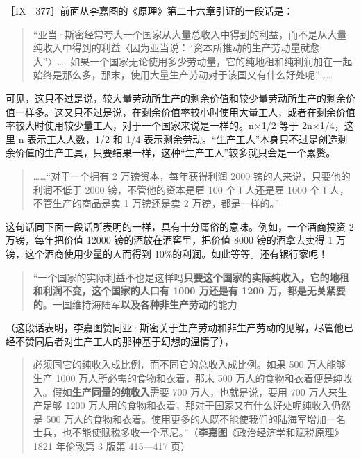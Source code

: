 
［IX—377］前面从李嘉图的《原理》第二十六章引证的一段话是：

\begin{quote}“亚当·斯密经常夸大一个国家从大量总收入中得到的利益，而不是从大量纯收入中得到的利益〈因为亚当说：“资本所推动的生产劳动量就愈大”〉……如果一个国家无论使用多少劳动量，它的纯地租和纯利润加在一起始终是那么多，那末，使用大量生产劳动对于该国又有什么好处呢”……\end{quote}

\fontbox{~\{}可见，这只不过是说，较大量劳动所生产的剩余价值和较少量劳动所生产的剩余价值一样多。这又只不过是说，在剩余价值率较小时使用大量工人，或者在剩余价值率较大时使用较少量工人，对于一个国家来说是一样的。n×1/2 等于 2n×1/4，这里 n 表示工人人数，1/2 和 1/4 表示剩余劳动。“生产工人”本身只不过是创造剩余价值的生产工具，只要结果一样，这种“生产工人”较多就只会是一个累赘。\fontbox{\}~}

\begin{quote}……“对于一个拥有 2 万镑资本，每年获得利润 2000 镑的人来说，只要他的利润不低于 2000 镑，不管他的资本是雇 100 个工人还是雇 1000 个工人，不管生产的商品是卖 1 万镑还是卖 2 万镑，都是一样的。”\end{quote}

\fontbox{~\{}这句话同下面一段话所表明的一样，具有十分庸俗的意味。例如，一个酒商投资 2 万镑，每年把价值 12000 镑的酒放在酒窖里，把价值 8000 镑的酒拿去卖得 1 万镑，这个酒商使用少量的人而得到 10\%的利润。如此等等。还有银行家呢！\fontbox{\}~}

\begin{quote}“一个国家的实际利益不也是这样吗\textbf{只要这个国家的实际纯收入，它的地租和利润不变，这个国家的人口有 1000 万还是有 1200 万，都是无关紧要的}。一国维持海陆军\textbf{以及各种非生产劳动}的能力\end{quote}

（这段话表明，李嘉图赞同亚·斯密关于生产劳动和非生产劳动的见解，尽管他已经不赞同后者对生产工人的那种基于幻想的温情了），

\begin{quote}必须同它的纯收入成比例，而不同它的总收入成比例。如果 500 万人能够生产 1000 万人所必需的食物和衣着，那末 500 万人的食物和衣着便是纯收入。假如\textbf{生产同量的纯收入}需要 700 万人，也就是说，要用 700 万人来生产足够 1200 万人用的食物和衣着，那对于国家又有什么好处呢纯收入仍然是 500 万人的食物和衣着。使用更多的人既不能使我们的陆海军增加一名士兵，也不能使赋税多收一个基尼。”（\textbf{李嘉图}《政治经济学和赋税原理》1821 年伦敦第 3 版第 415—417 页）\end{quote}

